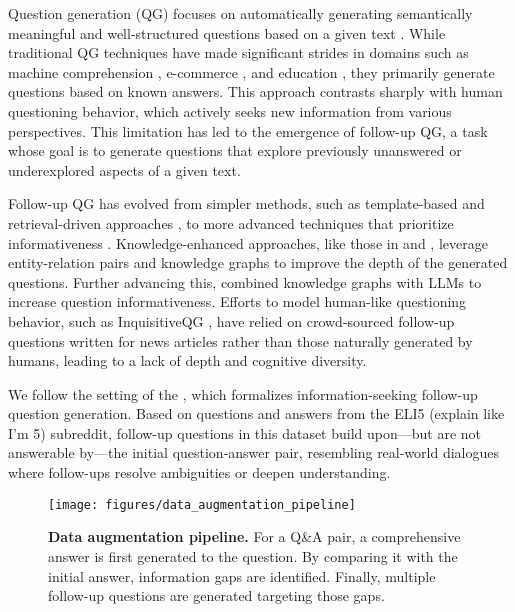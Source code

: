 Question generation (QG) focuses on automatically generating semantically meaningful and well-structured questions based on a given text \cite{ali-etal-2010-automatic}. While traditional QG techniques have made significant strides in domains such as machine comprehension \cite{du-etal-2017-learning, uto-etal-2023-difficulty}, e-commerce \cite{wang2021harvest}, and education \cite{luo-etal-2024-chain}, they primarily generate questions based on known answers. This approach contrasts sharply with human questioning behavior, which actively seeks new information from various perspectives. This limitation has led to the emergence of follow-up QG, a task whose goal is to generate questions that explore previously unanswered or underexplored aspects of a given text.

Follow-up QG has evolved from simpler methods, such as template-based and retrieval-driven approaches \cite{kumar2017incomplete, soni-roberts-2019-paraphrase, b-etal-2020-automatic}, to more advanced techniques that prioritize informativeness \cite{majumder-etal-2021-ask, mazzaccara-etal-2024-learning}. Knowledge-enhanced approaches, like those in \citet{ge-etal-2023-ask} and \citet{gupta-etal-2022-learning}, leverage entity-relation pairs and knowledge graphs to improve the depth of the generated questions. Further advancing this, \citet{liu-etal-2025-superficial} combined knowledge graphs with LLMs to increase question informativeness. Efforts to model human-like questioning behavior, such as InquisitiveQG \cite{ko-etal-2020-inquisitive}, have relied on crowd-sourced follow-up questions written for news articles rather than those naturally generated by humans, leading to a lack of depth and cognitive diversity.

We follow the setting of the \fd{} \cite{meng-etal-2023-followupqg}, which formalizes information-seeking follow-up question generation. Based on questions and answers from the ELI5 (explain like I'm 5) subreddit, follow-up questions in this dataset build upon---but are not answerable by---the initial question-answer pair, resembling real-world dialogues where follow-ups resolve ambiguities or deepen understanding. 

\begin{figure*}
    \centering
    \texttt{[image: figures/data\_augmentation\_pipeline]}
    \caption{\textbf{Data augmentation pipeline.} For a Q\&A pair, a comprehensive answer is first generated to the question. By comparing it with the initial answer, information gaps are identified. Finally, multiple follow-up questions are generated targeting those gaps.}
    \label{fig:data_aug_pipeline}
\end{figure*}

